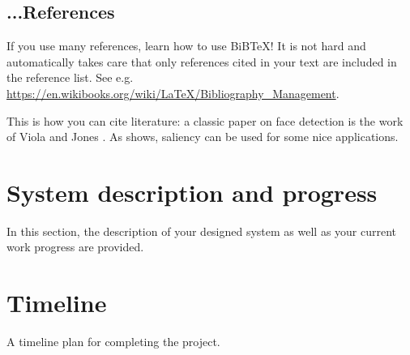 \documentclass[a4paper,11pt,english]{article}
\begin{document}
\subsection{...References}
If you use many references, learn how to use BiBTeX! It is not hard and automatically takes care that only references cited in your text are included in the reference list. See e.g. \url{https://en.wikibooks.org/wiki/LaTeX/Bibliography_Management}.

This is how you can cite literature: a classic paper on face detection is the work of Viola and Jones \cite{viola_jones04}. As \cite{frintrop_phd05} shows, saliency can be used for some nice applications.


\section{System description and progress}
In this section, the description of your designed system as well as your current work progress are provided.

\section{Timeline}
A timeline plan for completing the project.

\newpage


\end{document}
